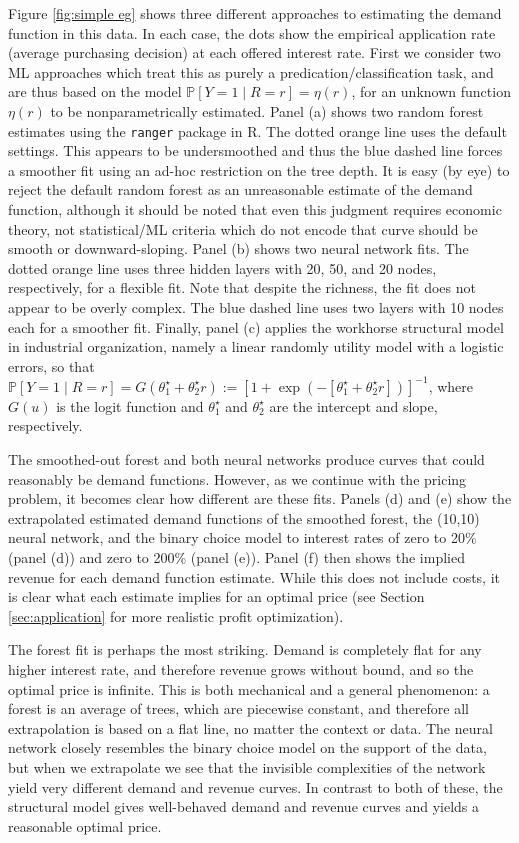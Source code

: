 \documentclass[12pt]{article}
\numberwithin{equation}{section}
\theoremstyle{definition}
\renewcommand{\P}{\mathbb{P}}
\newcommand{\ttrue}{\theta^\star}
\begin{document}
Figure \ref{fig:simple eg} shows three different approaches to estimating the demand function in this data. In each case, the dots show the empirical application rate (average purchasing decision) at each offered interest rate. First we consider two ML approaches which treat this as purely a predication/classification task, and are thus based on the model $\P[ Y \!=\! 1 \mid R \!=\! r] = \eta(r)$, 
for an unknown function $\eta(r)$ to be nonparametrically estimated. Panel (a) shows two random forest estimates using the {\tt ranger} package in {\sf R}. The dotted orange line uses the default settings. This appears to be undersmoothed and thus the blue dashed line forces a smoother fit using an ad-hoc restriction on the tree depth. It is easy (by eye) to reject the default random forest as an unreasonable estimate of the demand function, although it should be noted that even this judgment requires economic theory, not statistical/ML criteria which do not encode that curve should be smooth or downward-sloping. Panel (b) shows two neural network fits. The dotted orange line uses three hidden layers with 20, 50, and 20 nodes, respectively, for a flexible fit. Note that despite the richness, the fit does not appear to be overly complex. The blue dashed line uses two layers with 10 nodes each for a smoother fit. Finally, panel (c) applies the workhorse structural model in industrial organization, namely a linear randomly utility model with a logistic errors, so that $\P[ Y \!=\! 1 \mid R \!=\! r] = G\left(\ttrue_1 + \ttrue_2 r \right) := [1+\exp\left(-\left[\ttrue_1 + \ttrue_2 r\right]\right)]^{-1}$, where $G(u)$ is the logit function and $\ttrue_1$ and $\ttrue_2$ are the intercept and slope, respectively.

The smoothed-out forest and both neural networks produce curves that could reasonably be demand functions. However, as we continue with the pricing problem, it becomes clear how different are these fits. Panels (d) and (e) show the extrapolated estimated demand functions of the smoothed forest, the (10,10) neural network, and the binary choice model to interest rates of zero to 20\% (panel (d)) and zero to 200\% (panel (e)). Panel (f) then shows the implied revenue for each demand function estimate. While this does not include costs, it is clear what each estimate implies for an optimal price (see Section \ref{sec:application} for more realistic profit optimization). 


The forest fit is perhaps the most striking. Demand is completely flat for any higher interest rate, and therefore revenue grows without bound, and so the optimal price is infinite. This is both mechanical and a general phenomenon: a forest is an average of trees, which are piecewise constant, and therefore all extrapolation is based on a flat line, no matter the context or data. The neural network closely resembles the binary choice model on the support of the data, but when we extrapolate we see that the invisible complexities of the network yield very different demand and revenue curves. In contrast to both of these, the structural model gives well-behaved demand and revenue curves and yields a reasonable optimal price. 
\end{document}
